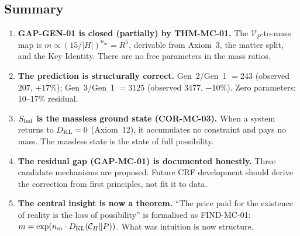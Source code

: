 \documentclass[12pt, a4paper]{article}
\begin{document}
\subsection{Summary}
\label{zc16:sec:summary}

\begin{enumerate}[leftmargin=*]

\item \textbf{GAP-GEN-01 is closed (partially) by THM-MC-01.}
  The $\mathcal{V}_P$-to-mass map is $m \propto (15/|H|)^{n_m}
  = R^5$, derivable from Axiom~3, the matter split, and
  the Key Identity. There are no free parameters in the
  mass ratios.

\item \textbf{The prediction is structurally correct.}
  Gen~2/Gen~1 $= 243$ (observed 207, $+17\%$);
  Gen~3/Gen~1 $= 3125$ (observed 3477, $-10\%$).
  Zero parameters; 10--17\% residual.

\item \textbf{$S_{\rm ind}$ is the massless ground state
  (COR-MC-03).} When a system returns to $D_{\rm KL} = 0$
  (Axiom~12), it accumulates no constraint and pays no mass.
  The massless state is the state of full possibility.

\item \textbf{The residual gap (GAP-MC-01) is documented
  honestly.} Three candidate mechanisms are proposed.
  Future CRF development should derive the correction
  from first principles, not fit it to data.

\item \textbf{The central insight is now a theorem.}
  ``The price paid for the existence of reality is the
  loss of possibility'' is formalised as FIND-MC-01:
  $m = \exp(n_m \cdot D_{\rm KL}(\mathcal{C}_H \| P))$.
  What was intuition is now structure.

\end{enumerate}
\end{document}
